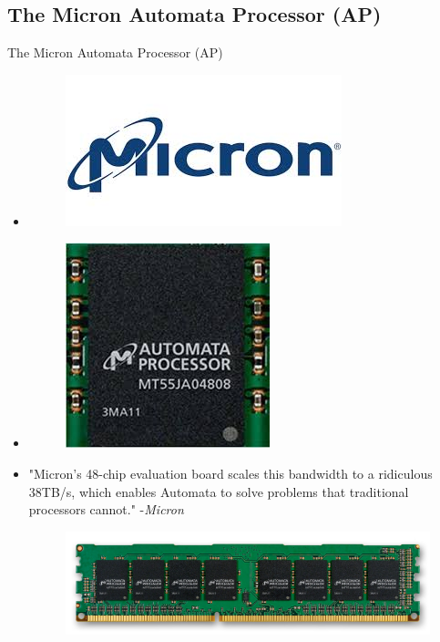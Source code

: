 \documentclass{beamer}
\begin{document}
  \subsection{The Micron Automata Processor  (AP)}

  \begin{frame}[allowframebreaks]{The Micron Automata Processor (AP)}
    \begin{itemize}
    \item {
      \begin{figure}[!h]
          \includegraphics[width=0.3\linewidth]{index.jpeg}
          \centering
      \end{figure}
    }
    \item {   
      \begin{figure}[!h]
          \includegraphics[width=0.5\linewidth]{automata.jpeg}
      \end{figure}
    }
    
          \item {"Micron’s 48-chip evaluation board scales this bandwidth to a ridiculous 38TB/s, which enables Automata to solve problems that traditional processors cannot." -\textit{Micron}
          \begin{figure}[!h]
          \includegraphics[width=1\linewidth]{high_res_automata_dimm.jpg}
              
          \end{figure}}
      \end{itemize}
      
      
  \end{frame}
\end{document}
